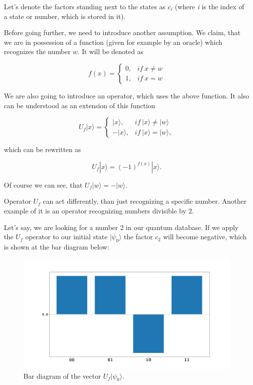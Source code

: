 Let's denote the factors standing next to the states as $c_i$ (where \textit{i} is the index of a state or number, which is stored in it).

Before going further, we need to introduce another assumption. We claim, that we are in possession of a function (given for example by an oracle) which recognizes the number $w$. It will be denoted as

\[ f(x) = \begin{cases}
        0, & if\  x \neq w \\
        1, & if\  x = w
        \end{cases} \]

We are also going to introduce an operator, which uses the above function. It also can be understood as an extension of this function

\[ U_f|x\rangle = \begin{cases}
        |x\rangle, & if\  |x\rangle \neq |w\rangle \\
        -|x\rangle, & if\  |x\rangle = |w\rangle,
        \end{cases} \]

which can be rewritten as 

\[ U_f|x\rangle = (-1)^{f(x)}|x\rangle. \]

Of course we can see, that $U_f|w\rangle = -|w\rangle$.

\begin{remark}
Operator $U_f$ can act differently, than just recognizing a specific number. Another example of it is an operator recognizing numbers divisible by 2.
\end{remark}

Let's say, we are looking for a number 2 in our quantum database. If we apply the $U_f$ operator to our initial state $|\psi_0\rangle$ the factor $c_2$ will become negative, which is shown at the bar diagram below:

\begin{figure}[ht]
\centering
\includegraphics[scale=0.25]{grover_bars_2.png}
\caption{Bar diagram of the vector $U_f|\psi_0\rangle$.}
\end{figure}

